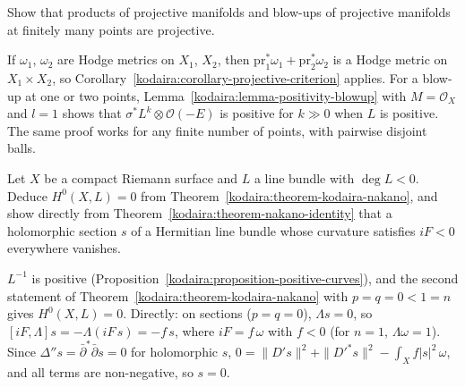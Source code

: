 \begin{exercise}\label{kodaira:exercise-products-blowups}
Show that products of projective manifolds and blow-ups of projective manifolds at finitely many points are projective.
\end{exercise}

\begin{solution}
If $\omega_1$, $\omega_2$ are Hodge metrics on $X_1$, $X_2$, then $\mathrm{pr}_1^*\omega_1 + \mathrm{pr}_2^*\omega_2$ is a Hodge metric on $X_1 \times X_2$, so
Corollary~\ref{kodaira:corollary-projective-criterion} applies. For a blow-up at one or two points, Lemma~\ref{kodaira:lemma-positivity-blowup} with
$M = \mathcal{O}_X$ and $l = 1$ shows that $\sigma^*L^k \otimes \mathcal{O}(-E)$ is positive for $k \gg 0$ when $L$ is positive. The same proof works for
any finite number of points, with pairwise disjoint balls.
\end{solution}

\begin{exercise}\label{kodaira:exercise-negative-degree}
Let $X$ be a compact Riemann surface and $L$ a line bundle with $\deg L < 0$. Deduce $H^0(X, L) = 0$ from
Theorem~\ref{kodaira:theorem-kodaira-nakano}, and show directly from Theorem~\ref{kodaira:theorem-nakano-identity} that a holomorphic section $s$ of
a Hermitian line bundle whose curvature satisfies $iF < 0$ everywhere vanishes.
\end{exercise}

\begin{solution}
$L^{-1}$ is positive (Proposition~\ref{kodaira:proposition-positive-curves}), and the second statement of Theorem~\ref{kodaira:theorem-kodaira-nakano}
with $p = q = 0 < 1 = n$ gives $H^0(X, L) = 0$. Directly: on sections ($p = q = 0$), $\Lambda s = 0$, so $[iF, \Lambda]s = -\Lambda(iF\,s) = -f\,s$, where
$iF = f\,\omega$ with $f < 0$ (for $n = 1$, $\Lambda\omega = 1$). Since $\Delta''s = \bar\partial^*\bar\partial s = 0$ for holomorphic $s$,
$0 = \|D's\|^2 + \|D'^*s\|^2 - \int_Xf|s|^2\,\omega$, and all terms are non-negative, so $s = 0$.
\end{solution}
